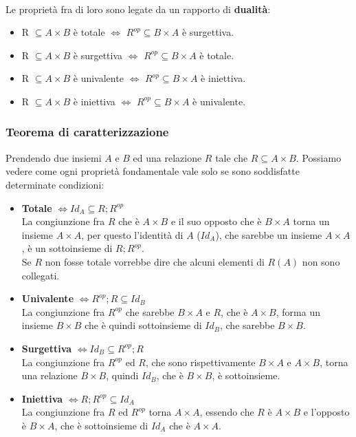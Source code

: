 \\
Le proprietà fra di loro sono legate da un rapporto di \textbf{dualità}:
\begin{itemize}
    \item R $\subseteq A \times B$ è totale $\Longleftrightarrow$ $R^{op} \subseteq B \times A$ è surgettiva.
    \item R $\subseteq A \times B$ è surgettiva $\Longleftrightarrow$ $R^{op} \subseteq B \times A$ è totale.
    \item R $\subseteq A \times B$ è univalente $\Longleftrightarrow$ $R^{op} \subseteq B \times A$ è iniettiva.
    \item R $\subseteq A \times B$ è iniettiva $\Longleftrightarrow$ $R^{op} \subseteq B \times A$ è univalente.
\end{itemize}

\subsubsection{Teorema di caratterizzazione}
\label{teorema-caratterizzazione}
Prendendo due insiemi $A$ e $B$ ed una relazione $R$ tale che $R \subseteq A \times B$. Possiamo vedere come ogni proprietà fondamentale vale solo se sono soddisfatte determinate condizioni:
\begin{itemize}
    \item \textbf{Totale} $\Longleftrightarrow Id_A \subseteq R;R^{op}$\\
    La congiunzione fra $R$ che è $A \times B$ e il suo opposto che è $B \times A$ torna un insieme $A \times A$, per questo l'identità di $A$ ($Id_A$), che sarebbe un insieme $A \times A$, è un sottoinsieme di $R;R^{op}$.\\
    Se $R$ non fosse totale vorrebbe dire che alcuni elementi di $R(A)$ non sono collegati.
    
    \item \textbf{Univalente} $\Longleftrightarrow R^{op};R \subseteq Id_B$\\
    La congiunzione fra $R^{op}$ che sarebbe $B \times A$ e $R$, che è $A \times B$, forma un insieme $B \times B$ che è quindi sottoinsieme di $Id_B$, che sarebbe $B \times B$.
    
    \item \textbf{Surgettiva} $\Longleftrightarrow Id_B \subseteq R^{op};R$\\
    La congiunzione fra $R^{op}$ ed $R$, che sono rispettivamente $B \times A$ e $A \times B$, torna una relazione $B \times B$, quindi $Id_B$, che è $B \times B$, è sottoinsieme.
    
    \item \textbf{Iniettiva} $\Longleftrightarrow R;R^{op} \subseteq Id_A$\\
    La congiunzione fra $R$ ed $R^{op}$ torna $A \times A$, essendo che $R$ è $A \times B$ e l'opposto è $B \times A$, che è sottoinsieme di $Id_A$ che è $A \times A$.
\end{itemize}

